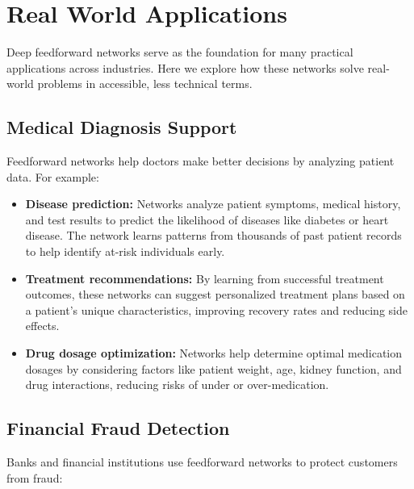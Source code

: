 
\section{Real World Applications}
\label{sec:feedforward-real-world}


Deep feedforward networks serve as the foundation for many practical applications across industries. Here we explore how these networks solve real-world problems in accessible, less technical terms.

\subsection{Medical Diagnosis Support}

Feedforward networks help doctors make better decisions by analyzing patient data. For example:

\begin{itemize}
    \item \textbf{Disease prediction:} Networks analyze patient symptoms, medical history, and test results to predict the likelihood of diseases like diabetes or heart disease. The network learns patterns from thousands of past patient records to help identify at-risk individuals early.
    
    \item \textbf{Treatment recommendations:} By learning from successful treatment outcomes, these networks can suggest personalized treatment plans based on a patient's unique characteristics, improving recovery rates and reducing side effects.
    
    \item \textbf{Drug dosage optimization:} Networks help determine optimal medication dosages by considering factors like patient weight, age, kidney function, and drug interactions, reducing risks of under or over-medication.
\end{itemize}

\subsection{Financial Fraud Detection}

Banks and financial institutions use feedforward networks to protect customers from fraud:

